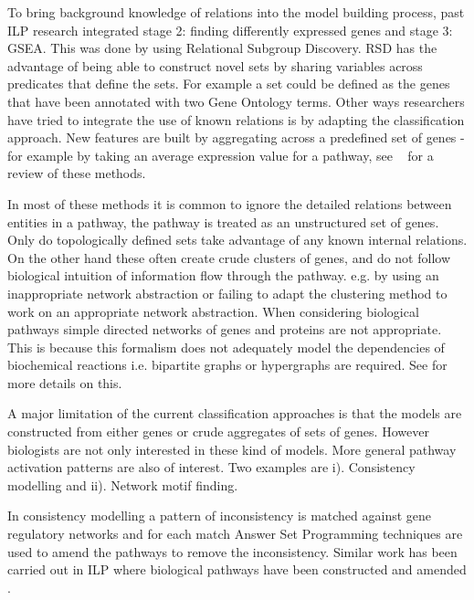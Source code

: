 \documentclass[runningheads,a4paper]{llncs}
\begin{document}
To bring background knowledge of relations into the model building process, past ILP research \citep{gamberger_induction_2004} integrated stage 2: finding differently expressed genes and stage 3: GSEA. This was done by using Relational Subgroup Discovery. RSD has the advantage of being able to construct novel sets by sharing variables across predicates that define the sets. For example a set could be defined as the genes that have been annotated with two Gene Ontology terms.  Other ways researchers have tried to integrate the use of known relations is by adapting the classification approach. New features are built by aggregating across a predefined set of genes - for example by taking an average expression value for a pathway, see ~\citep{holec_comparative_2012} for a review of these methods.

In most of these methods it is common to ignore the detailed relations between entities in a pathway, the pathway is treated as an unstructured set of genes. Only do topologically defined sets take advantage of any known internal relations. On the other hand these often create crude clusters of genes, and do not follow biological intuition of information flow through the pathway. e.g. by using an inappropriate network abstraction or failing to adapt the clustering method to work on an appropriate network abstraction. When considering biological pathways simple directed networks of genes and proteins are not appropriate. This is because this formalism does not adequately model the dependencies of biochemical reactions i.e. bipartite graphs or hypergraphs are required. See \citep{whelan2011representation} for more details on this. 

A major limitation of the current classification approaches is that the models are constructed from either genes or crude aggregates of sets of genes. However biologists are not only interested in these kind of models. More general pathway activation patterns are also of interest.
Two examples are i). Consistency modelling and ii). Network motif finding.

In consistency modelling \citep{guziolowski2010analysis} a pattern of inconsistency is matched against gene regulatory networks and for each match Answer Set Programming techniques are used to amend the pathways to remove the inconsistency. Similar work has been carried out in ILP  where biological pathways have been constructed and amended \citep{ray2010automatic}. 
\end{document}
